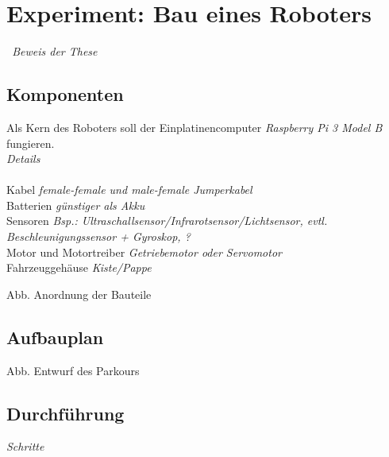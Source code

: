 \section{Experiment: Bau eines Roboters}
\textit{~Beweis der These}

\subsection{Komponenten}
Als Kern des Roboters soll der Einplatinencomputer \textit{Raspberry Pi 3 Model B} fungieren.
\\
\textit{Details}
\\
\\
Kabel
\textit{female-female und male-female Jumperkabel}
\\
Batterien
\textit{günstiger als Akku}
\\
Sensoren
\textit{Bsp.: Ultraschallsensor/Infrarotsensor/Lichtsensor, evtl. Beschleunigungssensor + Gyroskop, ?}
\\
Motor und Motortreiber
\textit{Getriebemotor oder Servomotor}
\\
Fahrzeuggehäuse
\textit{Kiste/Pappe}

Abb. Anordnung der Bauteile

\subsection{Aufbauplan}
Abb. Entwurf des Parkours

\subsection{Durchführung}
\textit{Schritte}